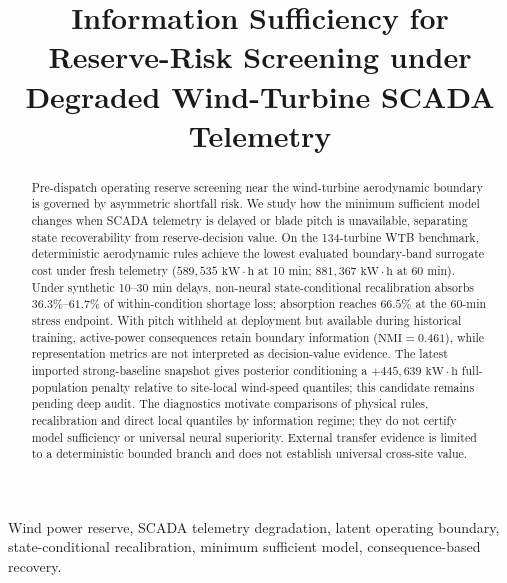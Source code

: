 \documentclass[
  journal]{IEEEtran}
\author{}
\date{}
\begin{document}
\title{Information Sufficiency for Reserve-Risk Screening under Degraded Wind-Turbine SCADA Telemetry}

\author{%
}

\maketitle

\begin{abstract}
Pre-dispatch operating reserve screening near the wind-turbine aerodynamic boundary is governed by asymmetric shortfall risk. We study how the minimum sufficient model changes when SCADA telemetry is delayed or blade pitch is unavailable, separating state recoverability from reserve-decision value. On the 134-turbine WTB benchmark, deterministic aerodynamic rules achieve the lowest evaluated boundary-band surrogate cost under fresh telemetry ($589{,}535\text{ kW}\cdot\text{h}$ at 10 min; $881{,}367\text{ kW}\cdot\text{h}$ at 60 min). Under synthetic 10--30 min delays, non-neural state-conditional recalibration absorbs $36.3\%$--$61.7\%$ of within-condition shortage loss; absorption reaches $66.5\%$ at the 60-min stress endpoint. With pitch withheld at deployment but available during historical training, active-power consequences retain boundary information ($\text{NMI}=0.461$), while representation metrics are not interpreted as decision-value evidence. The latest imported strong-baseline snapshot gives posterior conditioning a $+445{,}639\text{ kW}\cdot\text{h}$ full-population penalty relative to site-local wind-speed quantiles; this candidate remains pending deep audit. The diagnostics motivate comparisons of physical rules, recalibration and direct local quantiles by information regime; they do not certify model sufficiency or universal neural superiority. External transfer evidence is limited to a deterministic bounded branch and does not establish universal cross-site value.
\end{abstract}

\begin{IEEEkeywords}
Wind power reserve, SCADA telemetry degradation, latent operating boundary, state-conditional recalibration, minimum sufficient model, consequence-based recovery.
\end{IEEEkeywords}
\end{document}
